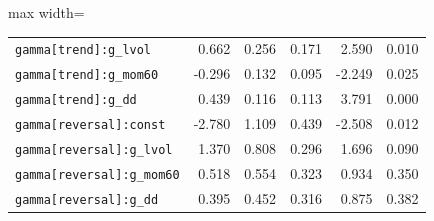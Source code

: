 \begin{table}[!htbp]
\begin{adjustbox}{max width=\textwidth}
\begin{tabular}{lrrrrr}
\texttt{gamma[trend]:g\_lvol} & 0.662 & 0.256 & 0.171 & 2.590 & 0.010\\
\texttt{gamma[trend]:g\_mom60} & -0.296 & 0.132 & 0.095 & -2.249 & 0.025\\
\texttt{gamma[trend]:g\_dd} & 0.439 & 0.116 & 0.113 & 3.791 & 0.000\\
\texttt{gamma[reversal]:const} & -2.780 & 1.109 & 0.439 & -2.508 & 0.012\\
\texttt{gamma[reversal]:g\_lvol} & 1.370 & 0.808 & 0.296 & 1.696 & 0.090\\
\texttt{gamma[reversal]:g\_mom60} & 0.518 & 0.554 & 0.323 & 0.934 & 0.350\\
\texttt{gamma[reversal]:g\_dd} & 0.395 & 0.452 & 0.316 & 0.875 & 0.382\\
\bottomrule
\end{tabular}
\end{adjustbox}
\end{table}
